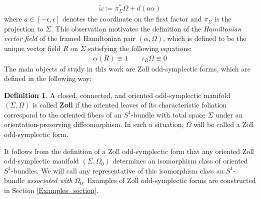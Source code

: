 \documentclass[11pt]{amsart}
\theoremstyle{plain}
\theoremstyle{definition}
\newtheorem{definition}[theorem]{Definition}
\theoremstyle{remark}
\begin{document}
\begin{align}
    \tilde \omega := \pi^*_{\Sigma}\Omega + d(a\alpha)
\end{align}
where $a \in [-\epsilon,\epsilon]$ denotes the coordinate on the first factor and $\pi_{\Sigma}$ is the projection to $\Sigma$. This observation motivates the definition of the \emph{Hamiltonian vector field} of the framed Hamiltonian pair $(\alpha,\Omega)$, which is defined to be the unique vector field $R$ on $\Sigma$ satisfying the following equations:
\begin{align}
    \alpha(R) \equiv 1 \qquad \iota_{R}\Omega \equiv 0
\end{align}
The main objects of study in this work are Zoll odd-symplectic forms, which are defined in the following way:
\begin{definition}\label{zoll_odd_symp_form_def}
    A closed, connected, and oriented odd-symplectic manifold $(\Sigma,\Omega)$ is called \textbf{Zoll} if the oriented leaves of its characteristic foliation correspond to the oriented fibers of an $S^1$-bundle with total space $\Sigma$ under an orientation-preserving diffeomorphism. In such a situation, $\Omega$ will be called a Zoll odd-symplectic form.
\end{definition}
It follows from the definition of a Zoll odd-symplectic form that any oriented Zoll odd-symplectic manifold $(\Sigma,\Omega_0)$ determines an isomorphism class of oriented $S^1$-bundles. We will call any representative of this isomorphism class an $S^1$-bundle \emph{associated with} $\Omega_0$. Examples of Zoll odd-symplectic forms are constructed in Section \ref{Examples_section}. 
\end{document}
